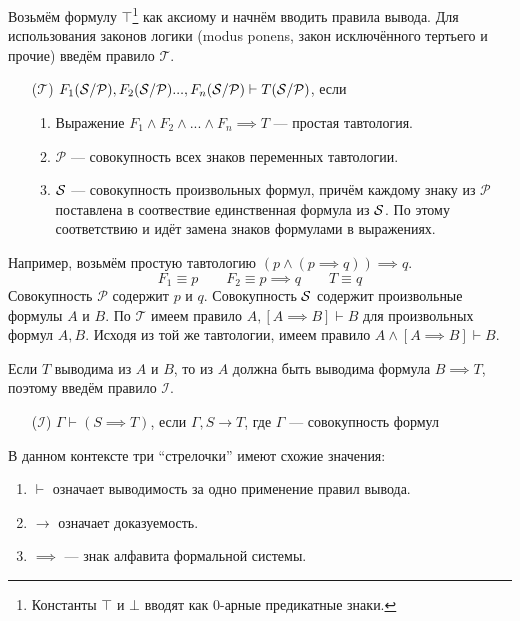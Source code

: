\newcommand\taut{$\mathcal T$}
\newcommand\axiom{$\mathcal A$}
\newcommand\implic{$\mathcal I$}
\newcommand\Px{\mathcal P}
Возьмём формулу $\top$\footnote{Константы $\top$ и $\bot$ вводят как
  \mbox{$0$-арные} предикатные знаки.}
как аксиому и начнём вводить правила вывода.
Для использования законов логики (modus ponens, закон
исключённого тертьего и прочие) введём правило \taut{}.
\begin{enumerate}
  \item[(\taut)]{}$F_1(\Sx/\Px),F_2(\Sx/\Px)...,F_n(\Sx/\Px)\vdash T(\Sx/\Px)$, если
  \index{правило!\taut}
  \begin{enumerate}
    \item{}Выражение ${F_1\land F_2\land...\land F_n\implies T}$ --- простая тавтология.
    \item{}$\Px$ --- совокупность всех знаков переменных тавтологии.
    \item{}$\mathcal S$ --- совокупность произвольных формул,
    причём каждому знаку из $\Px$
    поставлена в соотвествие единственная формула из $\mathcal S$.
    По этому соответствию и идёт замена знаков формулами в выражениях.
  \end{enumerate}
\end{enumerate}

Например, возьмём простую тавтологию $(p\land (p\implies q))\implies q$.
\[
  F_1\equiv p\qquad F_2\equiv p\implies q\qquad T\equiv q
\]
Совокупность $\Px$ содержит $p$ и $q$.
Совокупность $\mathcal S$ содержит произвольные формулы $A$ и $B$.
По \taut{} имеем правило ${A,[A\implies B]\vdash B}$
для произвольных формул $A,B$.
Исходя из той же тавтологии, имеем правило ${A\land[A\implies B]\vdash B}$.

Если $T$ выводима из $A$ и $B$, то из $A$ должна быть выводима формула $B\implies T$,
поэтому введём правило \implic{}.
\begin{enumerate}
  \item[(\implic)]{}${\Gamma\vdash (S\implies T)}$, если $\Gamma,S\to T$,
  \index{правило!\implic}
  где $\Gamma$ --- совокупность формул
\end{enumerate}
В данном контексте три ``стрелочки'' имеют схожие значения:
\begin{enumerate}
  \item{}$\vdash$ означает выводимость за одно применение правил вывода.
  \item{}$\to$ означает доказуемость.
  \item{}$\implies$ --- знак алфавита формальной системы.
\end{enumerate}


